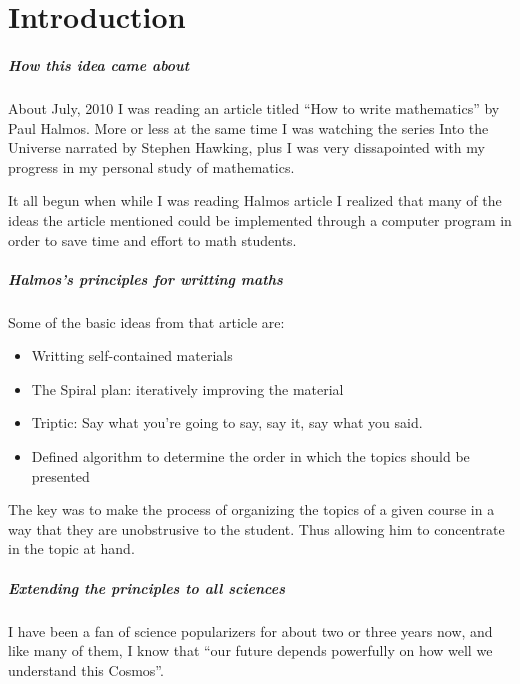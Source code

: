 \chapter{Introduction}

\paragraph{How this idea came about}
About July, 2010 I was reading an article titled
``How to write mathematics'' by Paul Halmos\cite{halmos_teach_math}.
More or less at the same time I was watching the series
Into the Universe narrated by Stephen Hawking, plus 
I was very dissapointed with my progress in my personal 
study of mathematics.\par

\indent
It all begun when while I was reading Halmos article
I realized that many of the ideas the article mentioned could
be implemented through a computer program in order 
to save time and effort to math students.\par

\paragraph{Halmos's principles for writting maths}
\indent
Some of the basic ideas from that article are:

\begin{itemize}
 \item Writting self-contained materials
 \item The Spiral plan: iteratively improving the material
 \item Triptic: Say what you're going to say, say it, 
    say what you said.
\item Defined algorithm to determine the order in which
the topics should be presented
\end{itemize}

\indent
The key was to make the process of organizing the topics of 
a given course in a way that they are unobstrusive to the 
student. Thus allowing him to concentrate in the topic at hand.
\par

\paragraph{ Extending the principles to all sciences}

\indent
I have been a fan of science popularizers for about two or three 
years now, and like many of them, I know that ``our future depends
powerfully on how well we understand this Cosmos''.
\par

